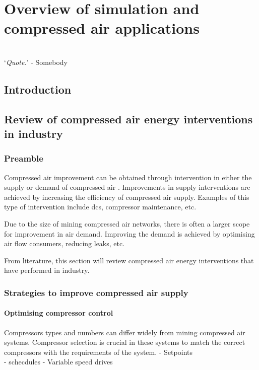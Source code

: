 \chapter{Overview of simulation and compressed air applications}
\thispagestyle{empty}
\vspace{38em}
\hrulefill
\\
\enquote*{\textit{Quote.}} - Somebody\\
\clearpage
\section{Introduction}
\section{Review of compressed air energy interventions in industry}
	\subsection{Preamble}
		Compressed air improvement can be obtained through intervention in either the supply or demand of compressed air \cite{Kriel2014Masters}. Improvements in supply interventions are achieved by increasing the efficiency of compressed air supply. Examples of this type of intervention include \gls{dcs}, compressor maintenance, etc. 
		\par
		Due to the size of mining compressed air networks, there is often a larger scope for improvement in air demand. Improving the  demand is achieved by optimising air flow consumers, reducing leaks, etc.
		\par
	 	From literature, this section will review compressed air energy interventions that have performed in industry.
	 	
	\subsection{Strategies to improve compressed air supply}
	
		\subsubsection{Optimising compressor control}
		Compressors types and numbers can differ widely from mining compressed air systems. Compressor selection is crucial in these systems to match the correct compressors with the requirements of the system. \cite{marais2010expert}
		- Setpoints\\
		- schecdules
		- Variable speed drives\\
		
